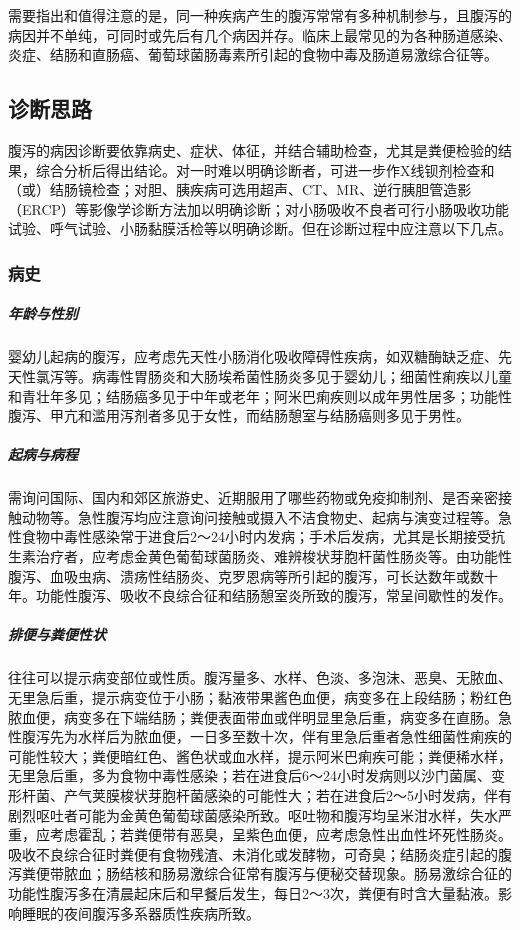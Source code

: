 需要指出和值得注意的是，同一种疾病产生的腹泻常常有多种机制参与，且腹泻的病因并不单纯，可同时或先后有几个病因并存。临床上最常见的为各种肠道感染、炎症、结肠和直肠癌、葡萄球菌肠毒素所引起的食物中毒及肠道易激综合征等。

\subsection{诊断思路}

腹泻的病因诊断要依靠病史、症状、体征，并结合辅助检查，尤其是粪便检验的结果，综合分析后得出结论。对一时难以明确诊断者，可进一步作X线钡剂检查和（或）结肠镜检查；对胆、胰疾病可选用超声、CT、MR、逆行胰胆管造影（ERCP）等影像学诊断方法加以明确诊断；对小肠吸收不良者可行小肠吸收功能试验、呼气试验、小肠黏膜活检等以明确诊断。但在诊断过程中应注意以下几点。

\subsubsection{病史}

\subparagraph{年龄与性别}

婴幼儿起病的腹泻，应考虑先天性小肠消化吸收障碍性疾病，如双糖酶缺乏症、先天性氯泻等。病毒性胃肠炎和大肠埃希菌性肠炎多见于婴幼儿；细菌性痢疾以儿童和青壮年多见；结肠癌多见于中年或老年；阿米巴痢疾则以成年男性居多；功能性腹泻、甲亢和滥用泻剂者多见于女性，而结肠憩室与结肠癌则多见于男性。

\subparagraph{起病与病程}

需询问国际、国内和郊区旅游史、近期服用了哪些药物或免疫抑制剂、是否亲密接触动物等。急性腹泻均应注意询问接触或摄入不洁食物史、起病与演变过程等。急性食物中毒性感染常于进食后2～24小时内发病；手术后发病，尤其是长期接受抗生素治疗者，应考虑金黄色葡萄球菌肠炎、难辨梭状芽胞杆菌性肠炎等。由功能性腹泻、血吸虫病、溃疡性结肠炎、克罗恩病等所引起的腹泻，可长达数年或数十年。功能性腹泻、吸收不良综合征和结肠憩室炎所致的腹泻，常呈间歇性的发作。

\subparagraph{排便与粪便性状}

往往可以提示病变部位或性质。腹泻量多、水样、色淡、多泡沫、恶臭、无脓血、无里急后重，提示病变位于小肠；黏液带果酱色血便，病变多在上段结肠；粉红色脓血便，病变多在下端结肠；粪便表面带血或伴明显里急后重，病变多在直肠。急性腹泻先为水样后为脓血便，一日多至数十次，伴有里急后重者急性细菌性痢疾的可能性较大；粪便暗红色、酱色状或血水样，提示阿米巴痢疾可能；粪便稀水样，无里急后重，多为食物中毒性感染；若在进食后6～24小时发病则以沙门菌属、变形杆菌、产气荚膜梭状芽胞杆菌感染的可能性大；若在进食后2～5小时发病，伴有剧烈呕吐者可能为金黄色葡萄球菌感染所致。呕吐物和腹泻均呈米泔水样，失水严重，应考虑霍乱；若粪便带有恶臭，呈紫色血便，应考虑急性出血性坏死性肠炎。吸收不良综合征时粪便有食物残渣、未消化或发酵物，可奇臭；结肠炎症引起的腹泻粪便带脓血；肠结核和肠易激综合征常有腹泻与便秘交替现象。肠易激综合征的功能性腹泻多在清晨起床后和早餐后发生，每日2～3次，粪便有时含大量黏液。影响睡眠的夜间腹泻多系器质性疾病所致。

